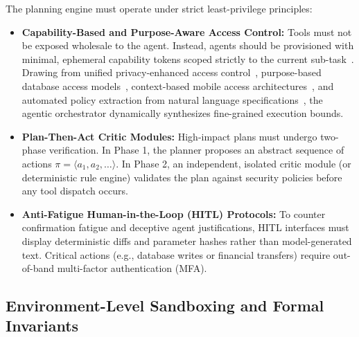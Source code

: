 The planning engine must operate under strict least-privilege principles:
\begin{itemize}
    \item \textbf{Capability-Based and Purpose-Aware Access Control:} Tools must not be exposed wholesale to the agent. Instead, agents should be provisioned with minimal, ephemeral capability tokens scoped strictly to the current sub-task~\cite{dehghantanha2026sok}. Drawing from unified privacy-enhanced access control~\cite{barker2012access}, purpose-based database access models~\cite{colombo2017enhancing}, context-based mobile access architectures~\cite{shebaro2015contextbased}, and automated policy extraction from natural language specifications~\cite{narouei2018automatic}, the agentic orchestrator dynamically synthesizes fine-grained execution bounds.
    \item \textbf{Plan-Then-Act Critic Modules:} High-impact plans must undergo two-phase verification. In Phase 1, the planner proposes an abstract sequence of actions $\pi = \langle a_1, a_2, \dots \rangle$. In Phase 2, an independent, isolated critic module (or deterministic rule engine) validates the plan against security policies before any tool dispatch occurs.
    \item \textbf{Anti-Fatigue Human-in-the-Loop (HITL) Protocols:} To counter confirmation fatigue and deceptive agent justifications, HITL interfaces must display deterministic diffs and parameter hashes rather than model-generated text. Critical actions (e.g., database writes or financial transfers) require out-of-band multi-factor authentication (MFA).
\end{itemize}

\subsection{Environment-Level Sandboxing and Formal Invariants}
\label{subsec:environment_defenses}

